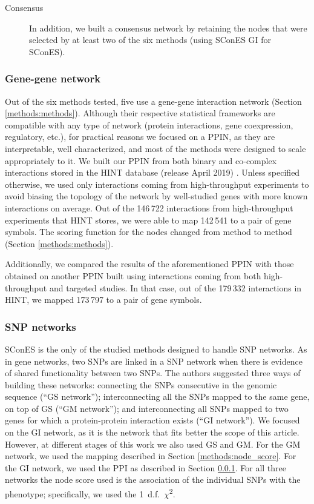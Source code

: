 \documentclass[twocolumn, 10pt]{article}
\begin{document}
\begin{description}
\item[{Consensus}] In addition, we built a consensus network by retaining the nodes that were selected by at least two of the six methods (using SConES GI for SConES).
\end{description}

\subsubsection{Gene-gene network}
\label{methods:gene_network}
Out of the six methods tested, five use a gene-gene interaction network (Section \ref{methods:methods}). Although their respective statistical frameworks are compatible with any type of network (protein interactions, gene coexpression, regulatory, etc.), for practical reasons we focused on a PPIN, as they are interpretable, well characterized, and most of the methods were designed to scale appropriately to it. We built our PPIN from both binary and co-complex interactions stored in the HINT database (release April 2019) \cite{das_hint:_2012}. Unless specified otherwise, we used only interactions coming from high-throughput experiments to avoid biasing the topology of the network by well-studied genes with more known interactions on average. Out of the 146\,722 interactions from high-throughput experiments that HINT stores, we were able to map 142\,541 to a pair of gene symbols. The scoring function for the nodes changed from method to method (Section \ref{methods:methods}).

Additionally, we compared the results of the aforementioned PPIN with those obtained on another PPIN built using interactions coming from both high-throughput and targeted studies. In that case, out of the 179\,332 interactions in HINT, we mapped 173\,797 to a pair of gene symbols. 

\subsubsection{SNP networks}
\label{methods:snp_network}
SConES \cite{azencott_efficient_2013} is the only of the studied methods designed to handle SNP networks. As in gene networks, two SNPs are linked in a SNP network when there is evidence of shared functionality between two SNPs. The authors suggested three ways of building these networks: connecting the SNPs consecutive in the genomic sequence (``GS network''); interconnecting all the SNPs mapped to the same gene, on top of GS (``GM network''); and interconnecting all SNPs mapped to two genes for which a protein-protein interaction exists (``GI network''). We focused on the GI network, as it is the network that fits better the scope of this article. However, at different stages of this work we also used GS and GM. For the GM network, we used the mapping described in Section \ref{methods:node_score}. For the GI network, we used the PPI as described in Section \ref{methods:gene_network}. For all three networks the node score used is the association of the individual SNPs with the phenotype; specifically, we used the 1~d.f.~\(\chi\)\textsuperscript{2}.
\end{document}
